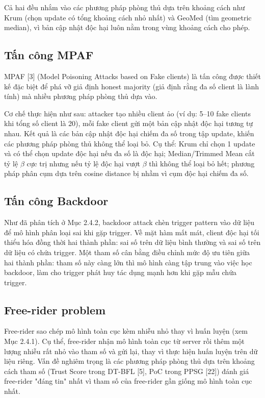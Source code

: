 Cả hai đều nhắm vào các phương pháp phòng thủ dựa trên khoảng cách như Krum (chọn update có tổng khoảng cách nhỏ nhất) và GeoMed (tìm geometric median), vì bản cập nhật độc hại luôn nằm trong vùng khoảng cách cho phép.

\subsection{Tấn công MPAF}
MPAF {[}3{]} (Model Poisoning Attacks based on Fake clients) là tấn công được thiết kế đặc biệt để phá vỡ giả định honest majority (giả định rằng đa số client là lành tính) mà nhiều phương pháp phòng thủ dựa vào.

Cơ chế thực hiện như sau: attacker tạo nhiều client ảo (ví dụ: 5--10 fake clients khi tổng số client là 20), mỗi fake client gửi một bản cập nhật độc hại tương tự nhau. Kết quả là các bản cập nhật độc hại chiếm đa số trong tập update, khiến các phương pháp phòng thủ không thể loại bỏ. Cụ thể: Krum chỉ chọn 1 update và có thể chọn update độc hại nếu đa số là độc hại; Median/Trimmed Mean cắt tỷ lệ $\beta$ cực trị nhưng nếu tỷ lệ độc hại vượt $\beta$ thì không thể loại bỏ hết; phương pháp phân cụm dựa trên cosine distance bị nhầm vì cụm độc hại chiếm đa số.

\subsection{Tấn công Backdoor}
Như đã phân tích ở Mục 2.4.2, backdoor attack chèn trigger pattern vào dữ liệu để mô hình phân loại sai khi gặp trigger. Về mặt hàm mất mát, client độc hại tối thiểu hóa đồng thời hai thành phần: sai số trên dữ liệu bình thường và sai số trên dữ liệu có chứa trigger. Một tham số cân bằng điều chỉnh mức độ ưu tiên giữa hai thành phần: tham số này càng lớn thì mô hình càng tập trung vào việc học backdoor, làm cho trigger phát huy tác dụng mạnh hơn khi gặp mẫu chứa trigger.

\subsection{Free-rider problem}
Free-rider sao chép mô hình toàn cục kèm nhiễu nhỏ thay vì huấn luyện (xem Mục 2.4.1). Cụ thể, free-rider nhận mô hình toàn cục từ server rồi thêm một lượng nhiễu rất nhỏ vào tham số và gửi lại, thay vì thực hiện huấn luyện trên dữ liệu riêng. Vấn đề nghiêm trọng là các phương pháp phòng thủ dựa trên khoảng cách tham số (Trust Score trong DT-BFL {[}5{]}, PoC trong PPSG {[}22{]}) đánh giá free-rider "đáng tin" nhất vì tham số của free-rider gần giống mô hình toàn cục nhất.

